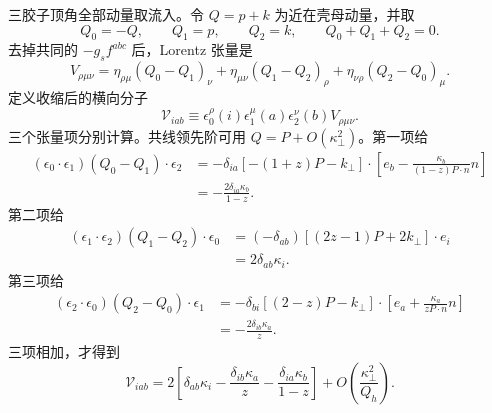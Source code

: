 \begin{derivation}
三胶子顶角全部动量取流入。令 $Q=p+k$ 为近在壳母动量，并取
\begin{equation*}
 Q_0=-Q,
 \qquad Q_1=p,
 \qquad Q_2=k,
 \qquad Q_0+Q_1+Q_2=0.
\end{equation*}
去掉共同的 $-g_sf^{abc}$ 后，Lorentz 张量是
\begin{equation*}
 V_{\rho\mu\nu}
 =\eta_{\rho\mu}(Q_0-Q_1)_\nu
 +\eta_{\mu\nu}(Q_1-Q_2)_\rho
 +\eta_{\nu\rho}(Q_2-Q_0)_\mu.
\end{equation*}
定义收缩后的横向分子
\begin{equation*}
 \mathcal V_{iab}
 \equiv
 \epsilon_0^\rho(i)\epsilon_1^\mu(a)\epsilon_2^\nu(b)
 V_{\rho\mu\nu}.
\end{equation*}
三个张量项分别计算。共线领先阶可用 $Q=P+O(\kappa_\perp^2)$。第一项给
\begin{align*}
 (\epsilon_0\cdot\epsilon_1)
 (Q_0-Q_1)\cdot\epsilon_2
 &=-\delta_{ia}
 \left[-(1+z)P-k_\perp\right]\cdot
 \left[e_b-\frac{\kappa_b}{(1-z)P\cdot n}n\right]\\
 &=-\frac{2\delta_{ia}\kappa_b}{1-z}.
\end{align*}
第二项给
\begin{align*}
 (\epsilon_1\cdot\epsilon_2)
 (Q_1-Q_2)\cdot\epsilon_0
 &=(-\delta_{ab})
 \left[(2z-1)P+2k_\perp\right]\cdot e_i\\
 &=2\delta_{ab}\kappa_i.
\end{align*}
第三项给
\begin{align*}
 (\epsilon_2\cdot\epsilon_0)
 (Q_2-Q_0)\cdot\epsilon_1
 &=-\delta_{bi}
 \left[(2-z)P-k_\perp\right]\cdot
 \left[e_a+\frac{\kappa_a}{zP\cdot n}n\right]\\
 &=-\frac{2\delta_{ib}\kappa_a}{z}.
\end{align*}
三项相加，才得到
\begin{equation*}
 \mathcal V_{iab}
 =2\left[
 \delta_{ab}\kappa_i
 -\frac{\delta_{ib}\kappa_a}{z}
 -\frac{\delta_{ia}\kappa_b}{1-z}
 \right]
 +O\!\left(\frac{\kappa_\perp^2}{Q_h}\right).
\end{equation*}


\end{derivation}
